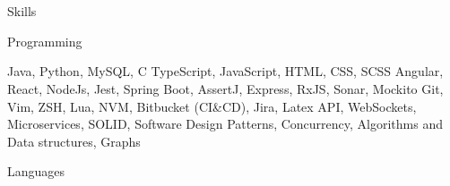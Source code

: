 \section{\faGears}{Skills}

\resumeEntryStart

\resumeEntryTD
{Programming}{}

 {Java, Python, MySQL, C}
 {TypeScript, JavaScript, HTML, CSS, SCSS}
 {Angular, React, NodeJs, Jest, Spring Boot, AssertJ, Express, RxJS, Sonar, Mockito}
 {Git, Vim, ZSH, Lua, NVM, Bitbucket (CI\&CD), Jira, Latex}
 {API, WebSockets, Microservices, SOLID, Software Design Patterns, Concurrency, Algorithms and Data structures, Graphs}

\resumeEntryEnd

\resumeEntryStart

\resumeEntryTD
{Languages}{}


\resumeEntryEnd
